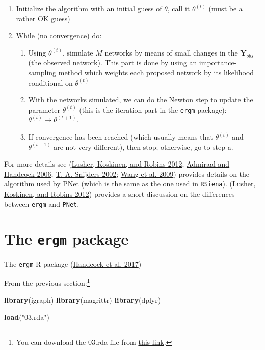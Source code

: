\documentclass[
]{book}
\newenvironment{Shaded}{\begin{snugshade}}{\end{snugshade}}
\newcommand{\FunctionTok}[1]{\textcolor[rgb]{0.13,0.29,0.53}{\textbf{#1}}}
\newcommand{\NormalTok}[1]{#1}
\newcommand{\StringTok}[1]{\textcolor[rgb]{0.31,0.60,0.02}{#1}}
\begin{document}
\begin{enumerate}
\def\labelenumi{\arabic{enumi}.}
\item
  Initialize the algorithm with an initial guess of \(\theta\), call it \(\theta^{(t)}\) (must be a rather OK guess)
\item
  While (no convergence) do:

  \begin{enumerate}
  \def\labelenumii{\alph{enumii}.}
  \item
    Using \(\theta^{(t)}\), simulate \(M\) networks by means of small changes in the \(\mathbf{Y}_{obs}\) (the observed network). This part is done by using an importance-sampling method which weights each proposed network by its likelihood conditional on \(\theta^{(t)}\)
  \item
    With the networks simulated, we can do the Newton step to update the parameter \(\theta^{(t)}\) (this is the iteration part in the \texttt{ergm} package): \(\theta^{(t)}\to\theta^{(t+1)}\).
  \item
    If convergence has been reached (which usually means that \(\theta^{(t)}\) and \(\theta^{(t + 1)}\) are not very different), then stop; otherwise, go to step a.
  \end{enumerate}
\end{enumerate}

For more details see (\protect\hyperlink{ref-lusher2012}{Lusher, Koskinen, and Robins 2012}; \protect\hyperlink{ref-admiraal2006}{Admiraal and Handcock 2006}; \protect\hyperlink{ref-Snijders2002}{T. A. Snijders 2002}; \protect\hyperlink{ref-Wang2009}{Wang et al. 2009}) provides details on the algorithm used by PNet (which is the same as the one used in \texttt{RSiena}). (\protect\hyperlink{ref-lusher2012}{Lusher, Koskinen, and Robins 2012}) provides a short discussion on the differences between \texttt{ergm} and \texttt{PNet}.

\hypertarget{the-ergm-package}{%
\section{\texorpdfstring{The \texttt{ergm} package}{The ergm package}}\label{the-ergm-package}}

The \texttt{ergm} R package (\protect\hyperlink{ref-R-ergm}{Handcock et al. 2017})

From the previous section:\footnote{You can download the 03.rda file from \href{https://github.com/gvegayon/appliedsnar}{this link}.}

\begin{Shaded}
\begin{Highlighting}[]
\FunctionTok{library}\NormalTok{(igraph)}
\FunctionTok{library}\NormalTok{(magrittr)}
\FunctionTok{library}\NormalTok{(dplyr)}

\FunctionTok{load}\NormalTok{(}\StringTok{"03.rda"}\NormalTok{)}
\end{Highlighting}
\end{Shaded}
\end{document}
